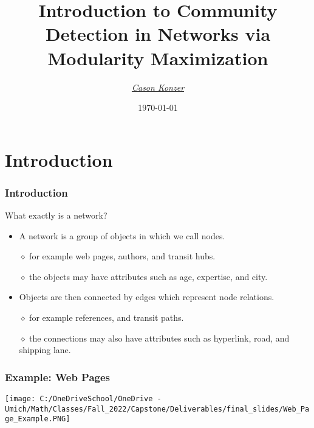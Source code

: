 \documentclass{beamer}
\title[Introduction to Community Detection in Networks]{Introduction to Community Detection in Networks via Modularity Maximization}
\author{\XV\textit{\large{\href{https://github.com/casonk}{Cason Konzer}}}\XB}
\institute[UM FLINT]{\normalsize{\textit{casonk@umich.edu}}}
\date[]{\today}
\begin{document}
\begin{frame}
    \titlepage
\end{frame}




\section{Introduction}

\begin{frame}

    \frametitle{Introduction}

    What exactly is a network?\pause

    \vspace{2.5mm}
    \begin{itemize}
        \item A network is a group of objects in which we call nodes.\pause
        \item[$\diamond$] for example web pages, authors, and transit hubs.\pause
        \item[$\diamond$] the objects may have attributes such as age, expertise, and city.\pause
        \item Objects are then connected by edges which represent node relations.\pause
        \item[$\diamond$] for example references, and transit paths.\pause
        \item[$\diamond$] the connections may also have attributes such as hyperlink, road, and shipping lane.   
    \end{itemize}

\end{frame}


\begin{frame}

    \frametitle{Example: Web Pages}
    \texttt{[image: C:/OneDriveSchool/OneDrive - Umich/Math/Classes/Fall\_2022/Capstone/Deliverables/final\_slides/Web\_Page\_Example.PNG]}

\end{frame}
\end{document}
